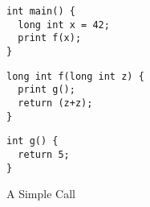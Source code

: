 \begin{figure}[b]
    \begin{minipage}{.25\textwidth}
\begin{verbatim}
int main() {
  long int x = 42;
  print f(x);
}
\end{verbatim}
    \end{minipage}
    \begin{minipage}{.4\textwidth}
\begin{verbatim}
long int f(long int z) {
  print g();
  return (z+z);
}
\end{verbatim}
    \end{minipage}
    \begin{minipage}{.25\textwidth}
\begin{verbatim}
int g() {
  return 5;
}
\end{verbatim}
    \end{minipage}
\caption{A Simple Call}
\label{fig:simple-program}
\end{figure}


\newcommand{\instrc}{lgray}
\newcommand{\mainsealc}{cyan}
\newcommand{\mainpassc}{magenta}
\newcommand{\fsealc}{green}
\newcommand{\unsealc}{gray}
\newcommand{\emptyoutc}{white} %
\newcommand{\fulloutc}{white}

